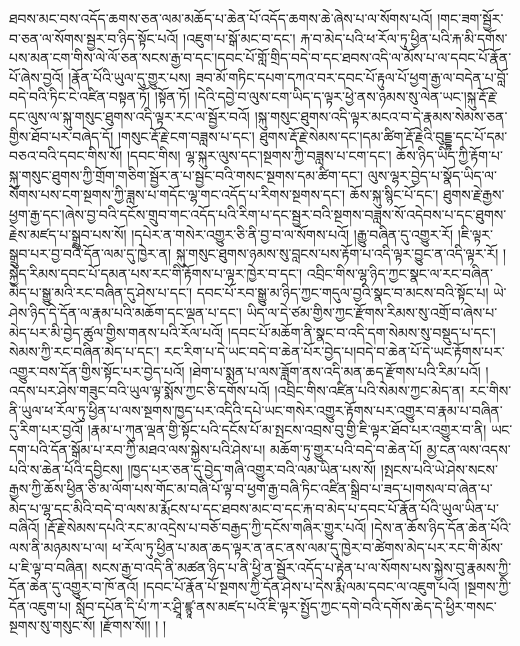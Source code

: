 ཐབས་མང་བས་འདོད་ཆགས་ཅན་ལམ་མཆོད་པ་ཆེན་པོ་འདོད་ཆགས་ཆེ་ཞེས་པ་ལ་སོགས་པའོ། །གང་ཟག་སྦྱོར་བ་ཅན་ལ་སོགས་སྦྱར་བ་ཉིད་སྟོང་པའོ། །འཇུག་པ་སྒོ་མང་བ་དང་། རྐ་བ་མེད་པའི་ཕ་རོལ་ཏུ་ཕྱིན་པའི་རྐ་མི་དགོས་པས་མན་ངག་གིས་ལེ་ལོ་ཅན་སངས་རྒྱ་བ་དང་།དབང་པོ་གློ་གྲིད་བདེ་བ་དང་ཐབས་འདི་ལ་མོས་པ་ལ་དབང་པོ་རྣོན་པོ་ཞེས་བྱའོ། །རྣོན་པོའི་ཡུལ་དུ་གྱུར་པས། ཟབ་མོ་གཏིང་དཔག་དཀའ་བར་དབང་པོ་རྟུལ་པོ་ཕྱག་རྒྱ་ལ་བདེན་པ་བློ་བདེ་བའི་ཏིང་ངེ་འཛིན་བསྟན་ཏོ། །སྟོན་ཏོ། །དེའི་དབྱེ་བ་ལུས་ངག་ཡིད་ད་ལྟར་ཕྱེ་ནས་ཉམས་སུ་ལེན་ཡང་།སྐུ་རྡོ་རྗེ་དང་ལུས་ལ་སྐུ་གསུང་ཐུགས་འདི་ལྟར་རང་ལ་སྦྱོར་བའོ། །སྐུ་གསུང་ཐུགས་འདི་ལྟར་མངའ་བ་དེ་རྣམས་སེམས་ཅན་གྱིས་ཐོབ་པར་བཞེད་དོ། །གསུང་རྡོ་རྗེ་ངག་བཟླས་པ་དང་། ཐུགས་རྡོ་རྗེ་སེམས་དང་།དམ་ཚིག་རྡོ་རྗེའི་བུདྡྷ་དང་པོ་དམ་བཅའ་བའི་དབང་གིས་སོ། །དབང་གིས། ལྷ་སྐུར་ལུས་དང་།སྔགས་ཀྱི་བཟླས་པ་ངག་དང་། ཆོས་ཉིད་ཡིད་ཀྱི་རྟོག་པ་སྐུ་གསུང་ཐུགས་ཀྱི་གྲོག་གཅིག་སྦྱོར་ན་པ་སྦྱང་བའི་གསང་སྔགས་དམ་ཚིག་དང་། ལུས་ལྷར་བྱེད་པ་སྣོད་ཡིད་ལ་སོགས་པས་ངག་སྔགས་ཀྱི་ཟླས་པ་གདོང་ལྷ་གང་འདོད་པ་རིགས་སྔགས་དང་། ཆོས་སྐུ་སྙིང་པོ་དང་། ཐུགས་རྗེ་རྒྱས་ཕྱག་རྒྱ་དང་།ཞེས་བྱ་བའི་དངོས་གྲུབ་གང་འདོད་པའི་རིག་པ་དང་སྦྱར་བའི་སྔགས་བཟླས་སོ་འདེབས་པ་དང་ཐུགས་རྗེས་མཛད་པ་སྒྲུབ་པས་སོ། །དཔེར་ན་གསེར་འགྱུར་ཅི་ནི་བྱ་བ་ལ་སོགས་པའོ། །རྒྱུ་བཞིན་དུ་འགྱུར་རོ། །ཇི་ལྟར་སྒྲུབ་པར་བྱ་བའི་དོན་ལམ་དུ་ཁྱེར་ན། སྐུ་གསུང་ཐུགས་ཉམས་སུ་བླངས་པས་རྟོག་པ་འདི་ལྟར་བྱུང་ན་འདི་ལྟར་རོ། །སྐྱེད་རིམས་དབང་པོ་དམན་པས་རང་གི་རྟོགས་པ་ལྟར་ཁྱེར་བ་དང་། འབྲིང་གིས་ལྷ་ཉིད་ཀྱང་སྣང་ལ་རང་བཞིན་མེད་པ་སྒྱུ་མའི་རང་བཞིན་དུ་ཤེས་པ་དང་། དབང་པོ་རབ་སྒྱུ་མ་ཉིད་ཀྱང་གདུལ་བྱའི་སྣང་བ་མངས་བའི་སྟོང་པ། ཡེ་ཤེས་ཉིད་དེ་དོན་ལ་རྣམ་པའི་མཆོག་དང་ལྡན་པ་དང་། ཡིད་ལ་དེ་ཙམ་གྱིས་ཀྱང་རྫོགས་རིམས་སུ་འགྲོ་བ་ཞེས་པ་མེད་པར་མི་བྱེད་ཚུལ་གྱིས་གནས་པའི་རོལ་པའོ། །དབང་པོ་མཆོག་ནི་སྣང་བ་འདི་དག་སེམས་སུ་བསྡུད་པ་དང་།སེམས་ཀྱི་རང་བཞིན་མེད་པ་དང་། རང་རིག་པ་དེ་ཡང་བདེ་བ་ཆེན་པོར་བྱེད་པ།བདེ་བ་ཆེན་པོ་དེ་ཡང་རྟོགས་པར་འགྱུར་བས་དོན་གྱིས་སྟོང་པར་བྱེད་པའོ། །ཐེག་པ་སྨན་པ་ལས་ཟློག་ནས་འདི་མན་ཆད་རྫོགས་པའི་རིམ་པའོ། །འདས་པར་ཤེས་གཟུང་བའི་ཡུལ་ལྟ་སྨོས་ཀྱང་ཅི་དགོས་པའོ། །འབྲིང་གིས་འཛིན་པའི་སེམས་ཀྱང་མེད་ན། རང་གིས་ནི་ཡུལ་ཕ་རོལ་ཏུ་ཕྱིན་པ་ལས་སྔགས་ཁྱད་པར་འདིའི་དཔེ་ཡང་གསེར་འགྱུར་རྟོགས་པར་འགྱུར་བ་རྣམ་པ་བཞིན་དུ་རིག་པར་བྱའོ། །རྣམ་པ་ཀུན་ལྡན་གྱི་སྟོང་པའི་དངོས་པོ་མ་སྤངས་འབྲས་བུ་གྱི་ཇི་ལྟར་ཐོབ་པར་འགྱུར་བ་ནི། ཡང་དག་པའི་དོན་སྒོམ་པ་རབ་ཀྱི་མཐའ་ལས་སྐྱེས་པའི་ཤེས་པ། མཆོག་ཏུ་གྱུར་པའི་བདེ་བ་ཆེན་པོ། མྱ་ངན་ལས་འདས་པའི་ས་ཆེན་པོའི་དབྱིངས། །ཁྱད་པར་ཅན་དུ་བྱེད་གཞི་འགྱུར་བའི་ལམ་ཡིན་པས་སོ། །སྤངས་པའི་ཡེ་ཤེས་སངས་རྒྱས་ཀྱི་ཆོས་ཕྱིན་ཅི་མ་ལོག་པས་གོང་མ་བཞི་པོ་ལྟ་བ་ཕྱག་རྒྱ་བཞི་ཏིང་འཛིན་སྒྲིབ་པ་ཟད་པ།གསལ་བ་ཞེན་པ་མེད་པ་ལྷ་དང་མིའི་བདེ་བ་ལས་མ་རྨོངས་པ་དང་ཐབས་མང་བ་དང་རྐ་བ་མེད་པ་དབང་པོ་རྣོན་པོའི་ཡུལ་ཡིན་པ་བཞིའོ། །རྡོ་རྗེ་སེམས་དཔའི་རང་མ་འདྲེས་པ་བཅོ་བརྒྱད་ཀྱི་དངོས་གཞིར་གྱུར་པའོ། །དེས་ན་ཆོས་ཉིད་དོན་ཆེན་པོའི་ལས་ནི་མཉམས་པ་ལ། ཕ་རོལ་ཏུ་ཕྱིན་པ་མན་ཆད་ལྟར་ན་ནང་ནས་ལམ་དུ་ཁྱེར་བ་ཚེགས་མེད་པར་རང་གི་མོས་པ་ཇི་ལྟ་བ་བཞིན། སངས་རྒྱ་བ་འདི་ནི་མཚན་ཉིད་པ་ནི་ཕྱི་ན་སྦྱོར་འདོད་པ་རྟེན་པ་ལ་སོགས་པས་སྐྱེས་བུ་རྣམས་ཀྱི་དོན་ཆེན་དུ་འགྱུར་བ་ཁོ་ནའོ། །དབང་པོ་རྣོན་པོ་སྔགས་ཀྱི་དོན་ཤེས་པ་དེས་རྨི་ལམ་དབང་ལ་འཇུག་པའོ། །སྔགས་ཀྱི་དོན་འཇུག་པ། སློབ་དཔོན་དི་པཾ་ཀ་ར་ཤྲཱི་ཛྙཱ་ནས་མཛད་པའོ་ཇི་ལྟར་སྤྱོད་ཀྱང་དགེ་བའི་དགོས་ཆེད་དེ་ཕྱིར་གསང་སྔགས་སུ་གསུང་སོ། །རྫོགས་སོ།། །
།